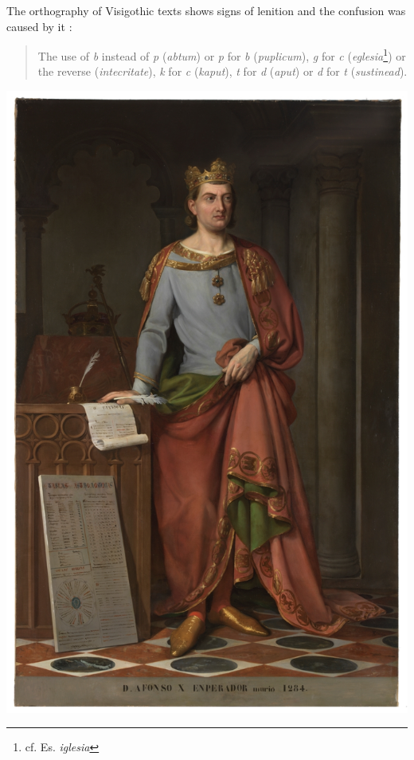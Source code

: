 \documentclass{report}[12pt]
\begin{document}
The orthography of Visigothic texts shows signs of lenition and the confusion was caused by it \parencite[p.~159]{latin_palaeography}:
\begin{quote}
  The use of \emph{b} instead of \emph{p} (\emph{abtum}) or \emph{p} for \emph{b} (\emph{puplicum}), \emph{g} for \emph{c} (\emph{eglesia}\footnote{cf. Es. \emph{iglesia}}) or the reverse (\emph{intecritate}), \emph{k} for \emph{c} (\emph{kaput}), \emph{t} for \emph{d} (\emph{aput}) or \emph{d} for \emph{t} (\emph{sustinead}).
\end{quote}

\pagebreak

\includegraphics[scale=0.45]{alfonso_x.jpg}

\thispagestyle{empty}
\end{document}

